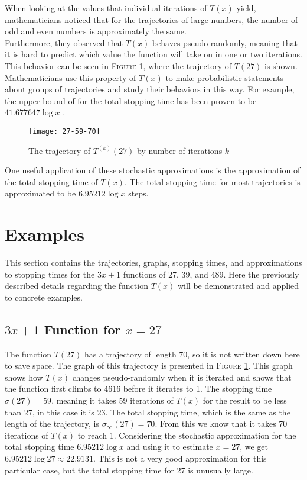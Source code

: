 \documentclass[12pt,a4paper,reqno]{amsart}
\begin{document}
When looking at the values that individual iterations of $T(x)$ yield,
mathematicians noticed that for the trajectories of large numbers, the number
of odd and even numbers is approximately the same. \\
Furthermore, they observed that $T(x)$ behaves pseudo-randomly, meaning that it 
is hard to predict which
value the function will take on in one or two iterations. This behavior can be
seen in \textsc{Figure} \ref{fig:01}, where the trajectory of $T(27)$ is shown. Mathematicians use
this property of $T(x)$ to make probabilistic statements about groups of
trajectories and study their behaviors in this way. For example, the upper
bound of for the total stopping time has been proven to be $41.677647 \log x$
\cite{src:03}.
\begin{figure}[h]
\texttt{[image: 27-59-70]}
    \caption{The trajectory of $T^{(k)}(27)$ by number of iterations $k$}
\label{fig:01}
\end{figure}
One useful application of these stochastic approximations is the approximation
of the total stopping time of $T(x)$. The total stopping time for most 
trajectories is approximated to be $6.95212 \log x$ steps. 


\section{Examples}

This section contains the trajectories, graphs, stopping times, and 
approximations to stopping times for the $3x+1$ functions of 27, 39, and 489.
Here the previously described details regarding the function $T(x)$ will be
demonstrated and applied to concrete examples.

\subsection{$3x+1$ Function for $x=27$}

The function $T(27)$ has a trajectory of length 70, so it is not written down here
to save space. The graph of this trajectory is presented in \textsc{Figure}
\ref{fig:01}. This graph shows how $T(x)$ changes pseudo-randomly when it is
iterated and shows that the function first climbs to 4616 before it iterates to 
1. The stopping time $\sigma(27)=59$, meaning it takes 59 iterations of $T(x)$
for the result to be less than 27, in this case it is 23. The total stopping
time, which is the same as the length of the trajectory, is
$\sigma_{\infty}(27)=70$. From this we know that it takes 70 iterations of
$T(x)$ to reach 1. Considering the stochastic approximation for the total 
stopping time $6.95212 \log x$ and using it to estimate $x=27$, we get $6.95212
\log 27 \approx 22.9131$. This is not a very good approximation for this
particular case, but the total stopping time for 27 is unusually large.
\end{document}
